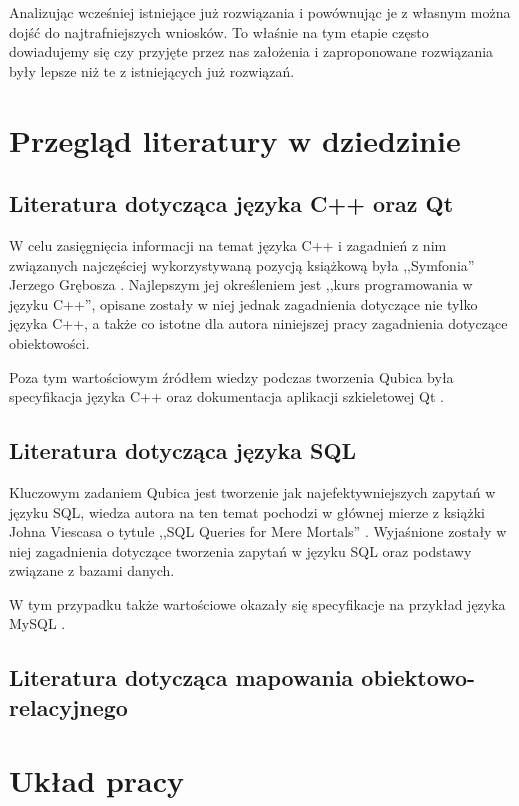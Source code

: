\documentclass[12pt]{report}
\begin{document}
Analizując wcześniej istniejące już rozwiązania i powównując je z własnym można dojść do najtrafniejszych wniosków. To właśnie na tym etapie często dowiadujemy się czy
przyjęte przez nas założenia i zaproponowane rozwiązania były lepsze niż te z istniejących już rozwiązań. 

\section{Przegląd literatury w dziedzinie}

\subsection{Literatura dotycząca języka C++ oraz Qt}

W celu zasięgnięcia informacji na temat języka C++ i zagadnień z nim związanych najczęściej wykorzystywaną pozycją książkową była ,,Symfonia'' Jerzego Grębosza \cite{symfonia}.
Najlepszym jej określeniem jest ,,kurs programowania w języku C++'', opisane zostały w niej jednak zagadnienia dotyczące nie tylko języka C++, a także co istotne dla
autora niniejszej pracy zagadnienia dotyczące obiektowości.

Poza tym wartościowym źródłem wiedzy podczas tworzenia Qubica była specyfikacja języka C++ \cite{cpp} oraz dokumentacja aplikacji szkieletowej Qt \cite{qt}.

\subsection{Literatura dotycząca języka SQL}

Kluczowym zadaniem Qubica jest tworzenie jak najefektywniejszych zapytań w języku SQL, wiedza autora na ten temat pochodzi w głównej mierze z książki Johna Viescasa o
tytule ,,SQL Queries for Mere Mortals'' \cite{sql}. Wyjaśnione zostały w niej zagadnienia dotyczące tworzenia zapytań w języku SQL oraz podstawy związane z bazami danych.

W tym przypadku także wartościowe okazały się specyfikacje na przykład języka MySQL \cite{mysql}.

\subsection{Literatura dotycząca mapowania obiektowo-relacyjnego}

\section{Układ pracy} %
\end{document}
